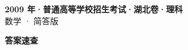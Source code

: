 \documentclass[zihao=-4, a4paper]{ctexart}
\begin{document}
\begin{center}
  {\Large\bfseries 2009 年·普通高等学校招生考试·湖北卷·理科}\\[4pt]
  {\large 数学 · 简答版}
\end{center}
\medskip
{}

\clearpage
{}
\begin{center}{\Large\bfseries 答案速查}\end{center}
\medskip

\end{document}
